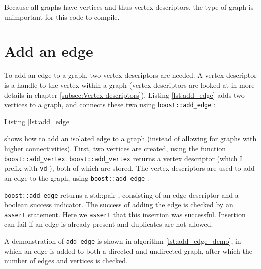 

Because all graphs have vertices and thus vertex descriptors, the type of
graph is unimportant for this code to compile.

\section{Add an edge}
\label{subsec:add_edge}

To add an edge to a graph, two vertex descriptors are needed.
A vertex descriptor 
is a handle to the vertex within a graph (vertex descriptors are looked
 at in more details in chapter 
\ref{subsec:Vertex-descriptors}).
Listing \ref{lst:add_edge}
adds two vertices to a graph, and connects these two using 
\verb;boost::add_edge; : 



Listing \ref{lst:add_edge}

shows how to add an isolated edge to a graph (instead of allowing for graphs
with higher connectivities).
First, two vertices are created, using the function \verb;boost::add_vertex;.
\verb;boost::add_vertex; returns a vertex descriptor 
(which I prefix with \verb;vd; ), 
both of which are stored.
The vertex descriptors are used to add an edge to the graph, 
using 
\verb;boost::add_edge; .

\verb;boost::add_edge; 
returns a std::pair , 
consisting of an edge descriptor and a boolean success indicator.
The success of adding the edge is checked by an \verb;assert; statement.
Here we \verb;assert; 
that this insertion was successful.
Insertion can fail if an edge is already present and duplicates are not
allowed.

A demonstration of \verb;add_edge; is shown in algorithm 
\ref{lst:add_edge_demo}, 
in which an edge is added to both a directed and undirected graph, 
after which the number of edges and vertices is checked.



